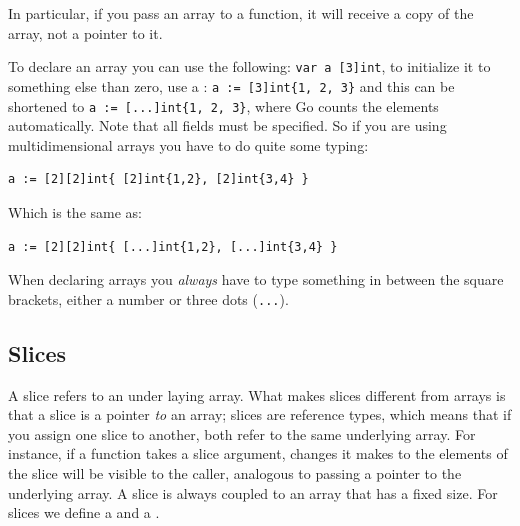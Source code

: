 In particular, if you pass an array to a function, it will receive a
copy of the array, not a pointer to it. 

To declare an array you can use the following: \lstinline{var a [3]int},
to initialize it to something else than zero, use a : \lstinline|a := [3]int{1, 2, 3}| and
this can be shortened to \lstinline|a := [...]int{1, 2, 3}|, where Go counts
the elements automatically. 
Note that all fields must be specified.  So if you are using multidimensional
arrays you have to do quite some typing:
\begin{lstlisting}
a := [2][2]int{ [2]int{1,2}, [2]int{3,4} }
\end{lstlisting}
Which is the same as:
\begin{lstlisting}
a := [2][2]int{ [...]int{1,2}, [...]int{3,4} }
\end{lstlisting}

When declaring arrays you \emph{always} have to type something in
between the square brackets, either a number or three dots (\verb|...|).

\subsection{Slices}
A slice refers to an under laying array. What makes slices different
from
arrays is that a slice is a pointer \emph{to} an array;
slices are reference types, which means that if you assign one slice to
another, both refer to the same underlying array. For instance, if a
function takes a slice argument, changes it makes to the elements of the
slice will be visible to the caller, analogous to passing a pointer to
the underlying array. A slice is always coupled to an array that has
a fixed size. For slices we define a  and a
. 

